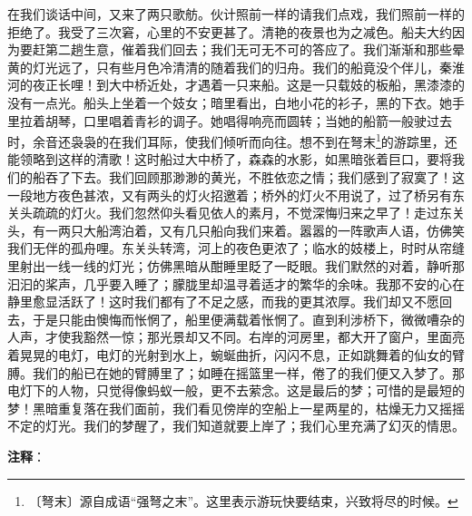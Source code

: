 \documentclass[12pt,UTF-8,openany]{ctexbook}
\begin{document}
\begin{large}
    在我们谈话中间，又来了两只歌舫。伙计照前一样的请我们点戏，我们照前一样的拒绝了。我受了三次窘，心里的不安更甚了。清艳的夜景也为之减色。船夫大约因为要赶第二趟生意，催着我们回去；我们无可无不可的答应了。我们渐渐和那些晕黄的灯光远了，只有些月色冷清清的随着我们的归舟。我们的船竟没个伴儿，秦淮河的夜正长哩！到大中桥近处，才遇着一只来船。这是一只载妓的板船，黑漆漆的没有一点光。船头上坐着一个妓女；暗里看出，白地小花的衫子，黑的下衣。她手里拉着胡琴，口里唱着青衫的调子。她唱得响亮而圆转；当她的船箭一般驶过去时，余音还袅袅的在我们耳际，使我们倾听而向往。想不到在弩末\footnote{〔弩末〕源自成语“强弩之末”。这里表示游玩快要结束，兴致将尽的时候。}的游踪里，还能领略到这样的清歌！这时船过大中桥了，森森的水影，如黑暗张着巨口，要将我们的船吞了下去。我们回顾那渺渺的黄光，不胜依恋之情；我们感到了寂寞了！这一段地方夜色甚浓，又有两头的灯火招邀着；桥外的灯火不用说了，过了桥另有东关头疏疏的灯火。我们忽然仰头看见依人的素月，不觉深悔归来之早了！走过东关头，有一两只大船湾泊着，又有几只船向我们来着。嚣嚣的一阵歌声人语，仿佛笑我们无伴的孤舟哩。东关头转湾，河上的夜色更浓了；临水的妓楼上，时时从帘缝里射出一线一线的灯光；仿佛黑暗从酣睡里眨了一眨眼。我们默然的对着，静听那汩汩的桨声，几乎要入睡了；朦胧里却温寻着适才的繁华的余味。我那不安的心在静里愈显活跃了！这时我们都有了不足之感，而我的更其浓厚。我们却又不愿回去，于是只能由懊悔而怅惘了，船里便满载着怅惘了。直到利涉桥下，微微嘈杂的人声，才使我豁然一惊；那光景却又不同。右岸的河房里，都大开了窗户，里面亮着晃晃的电灯，电灯的光射到水上，蜿蜒曲折，闪闪不息，正如跳舞着的仙女的臂膊。我们的船已在她的臂膊里了；如睡在摇篮里一样，倦了的我们便又入梦了。那电灯下的人物，只觉得像蚂蚁一般，更不去萦念。这是最后的梦；可惜的是最短的梦！黑暗重复落在我们面前，我们看见傍岸的空船上一星两星的，枯燥无力又摇摇不定的灯光。我们的梦醒了，我们知道就要上岸了；我们心里充满了幻灭的情思。
    
\end{large}


\newpage

\textbf{注释}：

\vspace{-1em}
\end{document}
